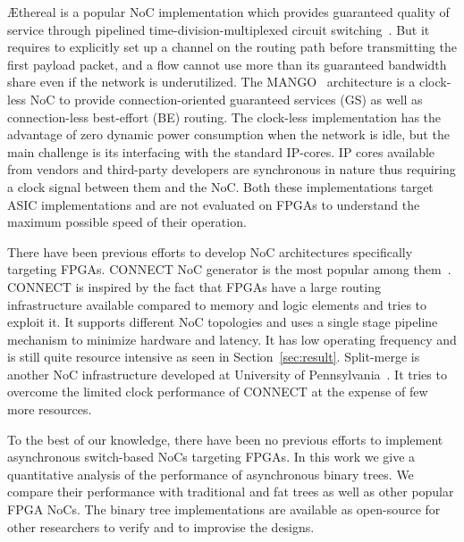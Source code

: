 {\AE}thereal is a popular NoC implementation which provides guaranteed quality of service through pipelined time-division-multiplexed circuit switching~\cite{Goossens2005}.
But it requires to explicitly set up a channel on the routing path before transmitting the first payload packet, and a flow cannot use more than its guaranteed bandwidth share even if the network is underutilized.
The MANGO~\cite{Bjerregaard2006} architecture is a clock-less NoC to provide connection-oriented guaranteed services (GS) as well as connection-less best-effort (BE) routing.
The clock-less implementation has the advantage of zero dynamic power consumption when the network is idle, but the main challenge is its interfacing with the standard IP-cores.
IP cores available from vendors and third-party developers are synchronous in nature thus requiring a clock signal between them and the NoC.
Both these implementations target ASIC implementations and are not evaluated on FPGAs to understand the maximum possible speed of their operation.

There have been previous efforts to develop NoC architectures specifically targeting FPGAs.
CONNECT NoC generator is the most popular among them~\cite{papa_connect_fpga2012}.
CONNECT is inspired by the fact that FPGAs have a large routing infrastructure available compared to memory and logic elements and tries to exploit it. 
It supports different NoC topologies and uses a single stage pipeline mechanism to minimize hardware and latency. 
It has low operating frequency and is still quite resource intensive as seen in Section~\ref{sec:result}. 
Split-merge is another NoC infrastructure developed at University of Pennsylvania~\cite{Huan2012}.
It tries to overcome the limited clock performance of CONNECT at the expense of few more resources.

To the best of our knowledge, there have been no previous efforts to implement asynchronous switch-based NoCs targeting FPGAs. 
In this work we give a quantitative analysis of the performance of asynchronous binary trees.
We compare their performance with traditional and fat trees as well as other popular FPGA NoCs.
The binary tree implementations are available as open-source for other researchers to verify and to improvise the designs.